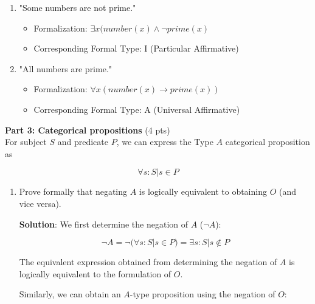 \documentclass[12pt]{article}
\begin{document}
\begin{spacing}{1.5}
\begin{enumerate}
		\item "Some numbers are not prime."
		      		      		      		      		      		      		      
		      \begin{itemize}
		      	\item Formalization: $\exists x(number(x) \land \neg prime(x)$
		      	\item Corresponding Formal Type: I (Particular Affirmative)
		      \end{itemize}
		      		      		      		      		      		      		        
		\item "All numbers are prime."
		      		      		      		      		      		      		      
		      \begin{itemize}
		      	\item Formalization: $\forall x(number(x) \rightarrow prime(x))$
		      	\item Corresponding Formal Type: A (Universal Affirmative)\\
		      \end{itemize}
		      		      		      		      		      		      		              
	\end{enumerate}
							
	\noindent \textbf{Part 3: Categorical propositions} (4 pts)\\
	For subject $S$ and predicate $P$, we can express the Type $A$ categorical proposition as
							
	$$\forall s : S | s \in P$$
							
	\begin{enumerate}
		\item Prove formally that negating $A$ is logically equivalent to obtaining $O$ (and vice versa).
		      		      		      		      		      		      		      
		      \textbf{Solution}: We first determine the negation of $A$ ($\neg A$):
		      		      		      		      		      		      		      
		      $$\neg A = \neg (\forall s : S | s \in P ) = \exists s : S | s \notin P$$
		      		      		      		      		      		      		      
		      The equivalent expression obtained from determining the negation of $A$ is logically equivalent to the formulation of $O$.
		      		      		      		      		      		      		      
		      Similarly, we can obtain an $A$-type proposition using the negation of $O$:
		      		      		      		      		      		      		      

\end{enumerate}
\end{spacing}
\end{document}

